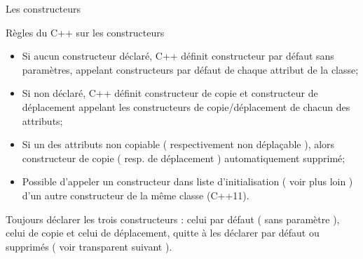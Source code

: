 \documentclass[compress,10pt,aspectratio=169]{beamer}
\begin{document}
  \begin{frame}[fragile]{Les constructeurs}
    \scriptsize
    \begin{block}{\small Règles du C++ sur les constructeurs}
    \begin{itemize}
      \item Si aucun constructeur déclaré, C++ définit constructeur par défaut sans 
            paramètres, appelant constructeurs par défaut de chaque attribut de la classe;
      \item Si non déclaré, C++ définit constructeur de copie et constructeur de déplacement 
            appelant les constructeurs de copie/déplacement de chacun des attributs;
      \item Si un des attributs non copiable ( respectivement non déplaçable ), alors 
            constructeur de copie ( resp. de déplacement ) automatiquement supprimé;
      \item Possible d'appeler un constructeur dans liste d'initialisation ( voir plus 
            loin ) d'un autre constructeur de la même classe (C++11).
    \end{itemize}
    \alert{Toujours déclarer les trois constructeurs : celui 
           par défaut ( sans paramètre ), celui de copie et celui de déplacement, quitte à les 
           déclarer par défaut ou supprimés ( voir transparent suivant ).}
    \end{block}
    \end{frame}
    
\end{document}

